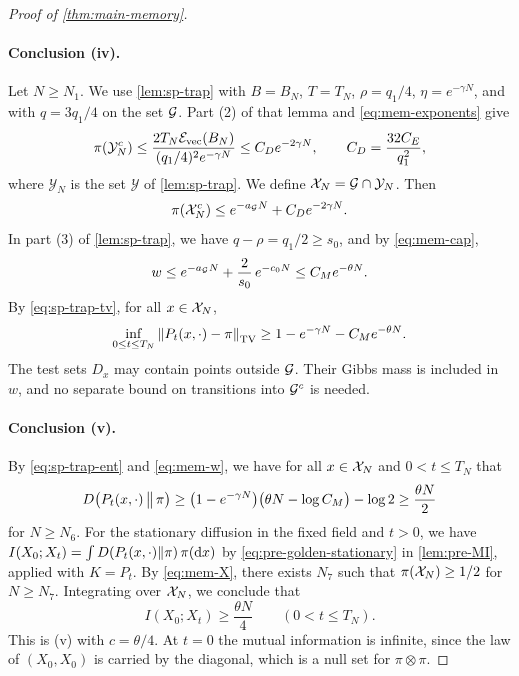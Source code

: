 \begin{proof}[Proof of \cref{thm:main-memory}]
\paragraph{Conclusion (iv).} Let $N\ge N_1$. We use \cref{lem:sp-trap} with $B=B_N$, $T=T_N$, $\rho=q_1/4$, $\eta=e^{-\gamma N}$, and with $q=3q_1/4$ on the set $\mathcal G$. Part (2) of that lemma and \eqref{eq:mem-exponents} give
\[
\pi(\mathcal Y_N^c)\le\frac{2T_N\mathcal E_{\rm vec}(B_N)}{(q_1/4)^2e^{-\gamma N}}\le C_De^{-2\gamma N},
\qquad
C_D=\frac{32C_E}{q_1^2},
\]
where $\mathcal Y_N$ is the set $\mathcal Y$ of \cref{lem:sp-trap}. We define $\mathcal X_N=\mathcal G\cap\mathcal Y_N$. Then
\begin{equation}\label{eq:mem-X}
\pi(\mathcal X_N^c)\le e^{-a_\mathcal G N}+C_De^{-2\gamma N}.
\end{equation}
In part (3) of \cref{lem:sp-trap}, we have $q-\rho=q_1/2\ge s_0$, and by \eqref{eq:mem-cap},
\begin{equation}\label{eq:mem-w}
w\le e^{-a_\mathcal G N}+\frac2{s_0}\,e^{-c_0N}\le C_Me^{-\theta N}.
\end{equation}
By \eqref{eq:sp-trap-tv}, for all $x\in\mathcal X_N$,
\begin{equation}\label{eq:mem-tv}
\inf_{0\le t\le T_N}\left\lVert P_t(x,\cdot)-\pi\right\rVert_{\mathrm{TV}}\ge1-e^{-\gamma N}-C_Me^{-\theta N}.
\end{equation}
The test sets $D_x$ may contain points outside $\mathcal G$. Their Gibbs mass is included in $w$, and no separate bound on transitions into $\mathcal G^c$ is needed.

\paragraph{Conclusion (v).} By \eqref{eq:sp-trap-ent} and \eqref{eq:mem-w}, we have for all $x\in\mathcal X_N$ and $0<t\le T_N$ that
\[
D\big(P_t(x,\cdot)\,\big\|\,\pi\big)\ge\big(1-e^{-\gamma N}\big)\big(\theta N-\log C_M\big)-\log2\ge\frac{\theta N}2
\]
for $N\ge N_6$. For the stationary diffusion in the fixed field and $t>0$, we have $I(X_0;X_t)=\int D(P_t(x,\cdot)\|\pi)\,\pi(\mathrm dx)$ by \eqref{eq:pre-golden-stationary} in \cref{lem:pre-MI}, applied with $K=P_t$. By \eqref{eq:mem-X}, there exists $N_7$ such that $\pi(\mathcal X_N)\ge1/2$ for $N\ge N_7$. Integrating over $\mathcal X_N$, we conclude that
\[
I(X_0;X_t)\ge\frac{\theta N}4\qquad(0<t\le T_N).
\]
This is (v) with $c=\theta/4$. At $t=0$ the mutual information is infinite, since the law of $(X_0,X_0)$ is carried by the diagonal, which is a null set for $\pi\otimes\pi$.


\end{proof}
